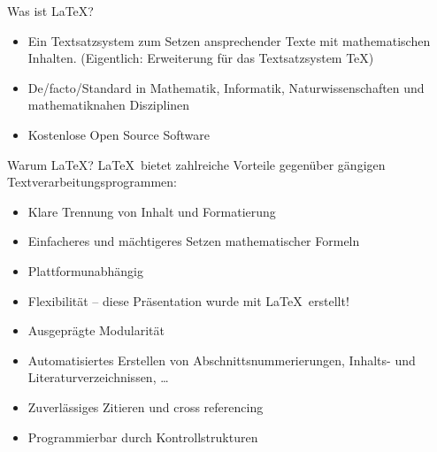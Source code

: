 \begin{frame}{Was ist \LaTeX?}
    \begin{itemize}
        \item Ein Textsatzsystem zum Setzen ansprechender Texte mit mathematischen Inhalten.
            (Eigentlich: Erweiterung für das Textsatzsystem \TeX)
        \smallskip
        \item De\-/facto\-/Standard in Mathematik, Informatik, Naturwissenschaften und
            mathematiknahen Disziplinen
        \smallskip
        \item Kostenlose Open Source Software
    \end{itemize}
\end{frame}

\begin{frame}{Warum \LaTeX?}
    \LaTeX~bietet zahlreiche Vorteile gegenüber gängigen Textverarbeitungsprogrammen:
    \begin{itemize}
        \item Klare Trennung von Inhalt und Formatierung
        \item Einfacheres und mächtigeres Setzen mathematischer Formeln
        \item Plattformunabhängig
        \item Flexibilität – diese Präsentation wurde mit \LaTeX~erstellt!
        \item Ausgeprägte Modularität
        \item Automatisiertes Erstellen von Abschnittsnummerierungen, Inhalts- und
            Literaturverzeichnissen, \dots
        \item Zuverlässiges Zitieren und cross referencing
        \item Programmierbar durch Kontrollstrukturen
    \end{itemize}
\end{frame}
